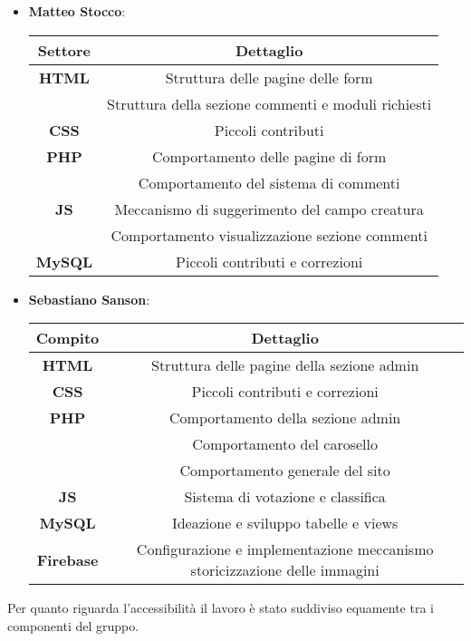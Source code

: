 \begin{itemize}
    \item \textbf{Matteo Stocco}: 
    \begin{center}
        \begin{tabular}{| c | c |}
            \hline
            \textbf{Settore} & \textbf{Dettaglio}  \\ [0.5ex]
            \hline \hline
            \textbf{HTML} & Struttura delle pagine delle form \\
            & Struttura della sezione commenti e moduli richiesti \\
            \hline
            \textbf{CSS} & Piccoli contributi \\
            \hline
            \textbf{PHP} & Comportamento delle pagine di form \\
            & Comportamento del sistema di commenti \\
            \hline
            \textbf{JS} & Meccanismo di suggerimento del campo creatura \\
            & Comportamento visualizzazione sezione commenti \\
            \hline
            \textbf{MySQL} & Piccoli contributi e correzioni \\
            \hline
        \end{tabular}
    \end{center}
    \item \textbf{Sebastiano Sanson}: 
    \begin{center}
        \begin{tabular}{| c | c |}
            \hline
            \textbf{Compito} & \textbf{Dettaglio}  \\ [0.5ex]
            \hline \hline
            \textbf{HTML} & Struttura delle pagine della sezione admin \\
            \hline
            \textbf{CSS} & Piccoli contributi e correzioni \\
            \hline
            \textbf{PHP} & Comportamento della sezione admin \\
            & Comportamento del carosello \\
            & Comportamento generale del sito \\
            \hline
            \textbf{JS} & Sistema di votazione e classifica \\
            \hline
            \textbf{MySQL} & Ideazione e sviluppo tabelle e views \\
            \hline
            \textbf{Firebase} & Configurazione e implementazione meccanismo storicizzazione delle immagini \\
            \hline
        \end{tabular}
    \end{center}
\end{itemize}

Per quanto riguarda l'accessibilità il lavoro è stato suddiviso equamente tra i componenti del gruppo.